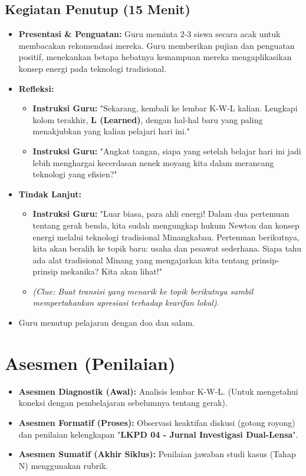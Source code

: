 \documentclass[a4paper,12pt]{article}
\begin{document}
\subsection{Kegiatan Penutup (15 Menit)}
\begin{itemize}
\item \textbf{Presentasi \& Penguatan:} Guru meminta 2-3 siswa secara acak untuk membacakan rekomendasi mereka. Guru memberikan pujian dan penguatan positif, menekankan betapa hebatnya kemampuan mereka mengaplikasikan konsep energi pada teknologi tradisional.
\item \textbf{Refleksi:}
    \begin{itemize}
    \item \textbf{Instruksi Guru:} "Sekarang, kembali ke lembar K-W-L kalian. Lengkapi kolom terakhir, \textbf{L (Learned)}, dengan hal-hal baru yang paling menakjubkan yang kalian pelajari hari ini."
    \item \textbf{Instruksi Guru:} "Angkat tangan, siapa yang setelah belajar hari ini jadi lebih menghargai kecerdasan nenek moyang kita dalam merancang teknologi yang efisien?"
    \end{itemize}
\item \textbf{Tindak Lanjut:}
    \begin{itemize}
    \item \textbf{Instruksi Guru:} "Luar biasa, para ahli energi! Dalam dua pertemuan tentang gerak benda, kita sudah mengungkap hukum Newton dan konsep energi melalui teknologi tradisional Minangkabau. Pertemuan berikutnya, kita akan beralih ke topik baru: usaha dan pesawat sederhana. Siapa tahu ada alat tradisional Minang yang mengajarkan kita tentang prinsip-prinsip mekanika? Kita akan lihat!"
    \item \textit{(Clue: Buat transisi yang menarik ke topik berikutnya sambil mempertahankan apresiasi terhadap kearifan lokal).}
    \end{itemize}
\item Guru menutup pelajaran dengan doa dan salam.
\end{itemize}

\section{Asesmen (Penilaian)}

\begin{itemize}
\item \textbf{Asesmen Diagnostik (Awal):} Analisis lembar K-W-L. (Untuk mengetahui koneksi dengan pembelajaran sebelumnya tentang gerak).
\item \textbf{Asesmen Formatif (Proses):} Observasi keaktifan diskusi (gotong royong) dan penilaian kelengkapan "\textbf{LKPD 04 - Jurnal Investigasi Dual-Lensa}".
\item \textbf{Asesmen Sumatif (Akhir Siklus):} Penilaian jawaban studi kasus (Tahap N) menggunakan rubrik.
\end{itemize}
\end{document}
